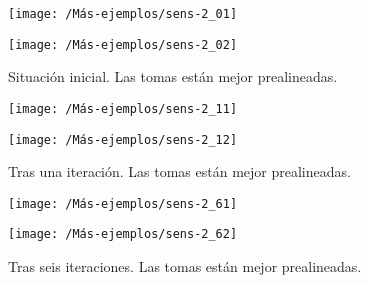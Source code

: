 \begin{figure}[h!]	
	\begin{minipage}{0.5\textwidth}
		\centering		
		\texttt{[image: /Más-ejemplos/sens-2\_01]} 
	\end{minipage}
	\begin{minipage}{0.5\textwidth}
		\centering
		\texttt{[image: /Más-ejemplos/sens-2\_02]}
	\end{minipage}	
	\caption{Situación inicial. Las tomas están mejor prealineadas.}
	\label{fig:sensi3-1}
\end{figure}
\begin{figure}[h!]	
	\begin{minipage}{0.5\textwidth}
		\centering		
		\texttt{[image: /Más-ejemplos/sens-2\_11]} 
	\end{minipage}
	\begin{minipage}{0.5\textwidth}
		\centering
		\texttt{[image: /Más-ejemplos/sens-2\_12]}
	\end{minipage}	
	\caption{Tras una iteración. Las tomas están mejor prealineadas.}
	\label{fig:sensi3-2}
\end{figure}
\begin{figure}[h!]	
	\begin{minipage}{0.5\textwidth}
		\centering		
		\texttt{[image: /Más-ejemplos/sens-2\_61]} 
	\end{minipage}
	\begin{minipage}{0.5\textwidth}
		\centering
		\texttt{[image: /Más-ejemplos/sens-2\_62]}
	\end{minipage}	
	\caption{Tras seis iteraciones. Las tomas están mejor prealineadas.}
	\label{fig:sensi3-3}
\end{figure}


